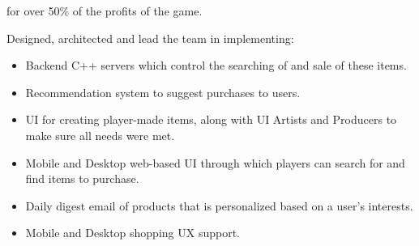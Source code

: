 \documentclass{article}
\begin{document}
for over 50\% of the profits of the game.
\par
\vspace{\baselineskip}
\pagebreak
Designed, architected and lead the team in implementing: 
\begin{small}
\begin{itemize}
  \item Backend C++ servers which control the searching of and sale of these items.
  \item Recommendation system to suggest purchases to users.
  \item UI for creating player-made items, along with UI Artists  and Producers to make sure all needs were met.
  \item Mobile and Desktop web-based UI through which players can search for and find items to purchase.  
  \item Daily digest email of products that is personalized based on a user's interests.
  \item Mobile and Desktop shopping UX support.
\end{itemize}
\end{small}
\end{document}
